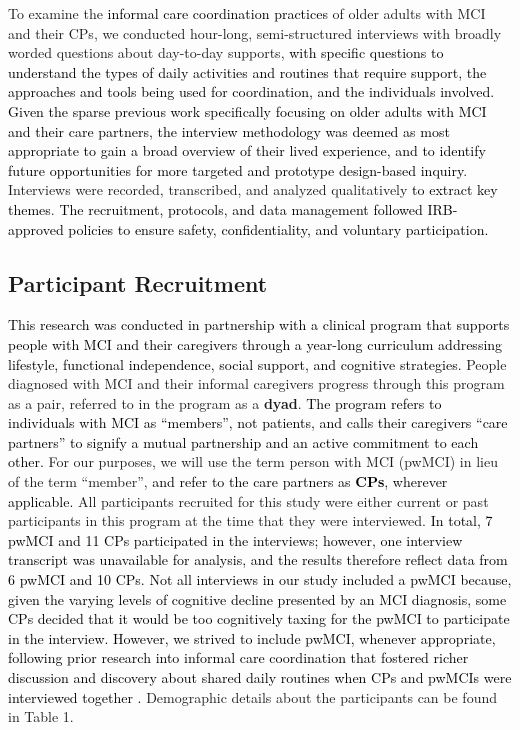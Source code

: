 \documentclass[acmsmall]{acmart}
\begin{document}
To examine the \textcolor{black}{informal care coordination practices} of older adults with MCI and their CPs, we conducted hour-long, semi-structured interviews with broadly worded questions about day-to-day supports, \textcolor{black}{with specific questions to understand the types of daily activities and routines that require support, the approaches and tools being used for coordination, and the individuals involved. Given the sparse previous work specifically focusing on older adults with MCI and their care partners, the interview methodology was deemed as most appropriate to gain a broad overview of their lived experience, and to identify future opportunities for more targeted and prototype design-based inquiry}. Interviews were recorded, transcribed, and analyzed qualitatively \textcolor{black}{to extract key themes}. \textcolor{black}{The recruitment, protocols, and data management followed IRB-approved policies to ensure safety, confidentiality, and voluntary participation.}

\subsection{Participant Recruitment}

\textcolor{black}{This research was conducted in partnership with a clinical program that supports people with MCI and their caregivers through a year-long curriculum addressing lifestyle, functional independence, social support, and cognitive strategies.} People diagnosed with MCI and their informal caregivers progress through this program as a pair, referred to in the program as a \textbf{dyad}. \textcolor{black}{The program refers to individuals with MCI as “members”, not patients, and calls their caregivers “care partners” to signify a mutual partnership and an active commitment to each other.} For our purposes, we will use the term person with MCI (pwMCI) in lieu of the term “member”, \textcolor{black}{and refer to the care partners as \textbf{CPs}, wherever applicable.} All participants recruited for this study were either current or past participants in this program at the time that they were interviewed. \textcolor{black}{In total, 7 pwMCI and 11 CPs participated in the interviews; however, one interview transcript was unavailable for analysis, and the results therefore reflect data from 6 pwMCI and 10 CPs.} \textcolor{black}{Not all interviews in our study included a pwMCI because, given the varying levels of cognitive decline presented by an MCI diagnosis, some CPs decided that it would be too cognitively taxing for the pwMCI to participate in the interview. However, we strived to include pwMCI, whenever appropriate, following prior research into informal care coordination that fostered richer discussion and discovery about shared daily routines when CPs and pwMCIs \textcolor{black}{were} interviewed together \cite{mathur2025sometimes}.} Demographic details about the participants can be found in Table 1. 
\end{document}

